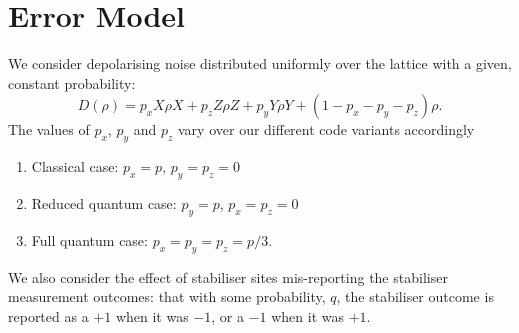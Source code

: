 



\section{Error Model}

We consider depolarising noise distributed uniformly over the lattice with a given, constant probability:
\begin{equation} \label{noise_eq}
  D(\rho) = p_x X\rho X +  p_z Z\rho Z + p_y Y\rho Y  + (1- p_x - p_y - p_z)\rho.
\end{equation}
The values of $p_x$, $p_y$ and $p_z$ vary over our different code variants accordingly
\begin{enumerate}
  \item Classical case: $p_x = p$, $p_y = p_z = 0$
  \item Reduced quantum case: $p_y = p$, $p_x = p_z = 0$
  \item Full quantum case: $p_x = p_y = p_z = p/3$.
\end{enumerate}

We also consider the effect of stabiliser sites mis-reporting the stabiliser measurement outcomes: that with some probability, $q$, the stabiliser outcome is reported as a $+1$ when it was $-1$, or a $-1$ when it was $+1$.

